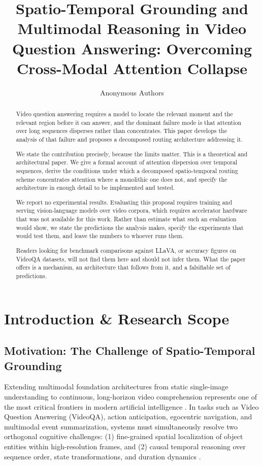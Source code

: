 \documentclass{article}
\title{Spatio-Temporal Grounding and Multimodal Reasoning in Video Question Answering: Overcoming Cross-Modal Attention Collapse}
\author{
  Anonymous Authors
}
\begin{document}
\maketitle

\begin{abstract}
Video question answering requires a model to locate the relevant moment and the relevant region before it can answer, and the dominant failure mode is that attention over long sequences disperses rather than concentrates. This paper develops the analysis of that failure and proposes a decomposed routing architecture addressing it.

We state the contribution precisely, because the limits matter. This is a theoretical and architectural paper. We give a formal account of attention dispersion over temporal sequences, derive the conditions under which a decomposed spatio-temporal routing scheme concentrates attention where a monolithic one does not, and specify the architecture in enough detail to be implemented and tested.

We report no experimental results. Evaluating this proposal requires training and serving vision-language models over video corpora, which requires accelerator hardware that was not available for this work. Rather than estimate what such an evaluation would show, we state the predictions the analysis makes, specify the experiments that would test them, and leave the numbers to whoever runs them.

Readers looking for benchmark comparisons against LLaVA, or accuracy figures on VideoQA datasets, will not find them here and should not infer them. What the paper offers is a mechanism, an architecture that follows from it, and a falsifiable set of predictions.
\end{abstract}






\section{Introduction \& Research Scope}



\subsection{Motivation: The Challenge of Spatio-Temporal Grounding}


Extending multimodal foundation architectures from static single-image understanding to continuous, long-horizon video comprehension represents one of the most critical frontiers in modern artificial intelligence \cite{arxiv_2010_11146,arxiv_2005_14165}. In tasks such as Video Question Answering (VideoQA), action anticipation, egocentric navigation, and multimodal event summarization, systems must simultaneously resolve two orthogonal cognitive challenges: (1) fine-grained spatial localization of object entities within high-resolution frames, and (2) causal temporal reasoning over sequence order, state transformations, and duration dynamics \cite{arxiv_2203_02155,arxiv_2312_03893}.
\end{document}
